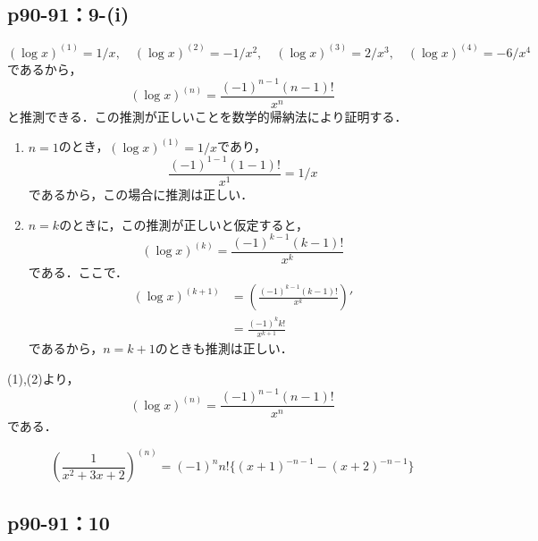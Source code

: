 \documentclass[a4paper,10pt,fleqn]{ltjsarticle}
\begin{document}
\subsection*{p90-91：9-(i)}

\begin{tleftbar}
    \[
       ( \log x )^{(1)}= 1/x , \quad (\log x)^{(2)} = - 1/x^2 , \quad (\log x)^{(3)} = 2/x^3,\quad (\log x)^{(4)} = - 6 /x^4
    \]
    であるから，
    \[
        (\log x)^{(n)} = \frac{(-1)^{n-1}  (n-1)!}{x^n}
    \]
    と推測できる．この推測が正しいことを数学的帰納法により証明する．
    \begin{enumerate}
        \item $n=1$のとき，$(\log x)^{(1)} = 1/x$であり，
        \[
            \frac{(-1)^{1-1}  (1-1)!}{x^1}=1/x
        \]
        であるから，この場合に推測は正しい．
        \item $n=k$のときに，この推測が正しいと仮定すると，
        \[
            (\log x)^{(k)} = \frac{(-1)^{k-1}  (k-1)!}{x^k}
        \]
        である．ここで．
        \begin{align*} 
            (\log x)^{(k+1)} &= \left (\frac{(-1)^{k-1}  (k-1)!}{x^k} \right ) ' \\
            & = \frac{(-1)^k  k!}{x^{k+1}}
        \end{align*} 
        であるから，$n=k+1$のときも推測は正しい．
    \end{enumerate}
    (1),(2)より，
    \[
        (\log x)^{(n)} = \frac{(-1)^{n-1}  (n-1)!}{x^n}
     \]
     である．
\end{tleftbar}

\begin{tleftbar}
    \[
      \left(   \frac{1}{x^2+3x+2} \right)^{(n)} = (-1)^n n! \{ (x+1)^{-n-1} - (x+2)^{-n-1} \} 
    \]
\end{tleftbar}



\subsection*{p90-91：10}
\end{document}

